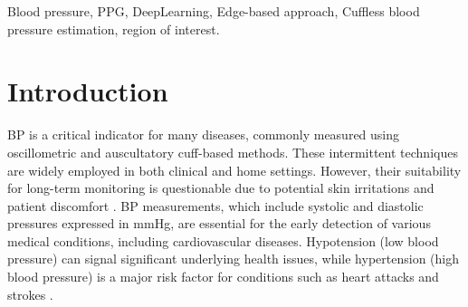\documentclass[journal,twoside,web]{ieeecolor}
\begin{document}
{{\begin{minipage}{\textwidth}
\begin{IEEEkeywords}
Blood pressure, PPG, DeepLearning, Edge-based approach, Cuffless blood pressure estimation, region of interest.
\end{IEEEkeywords}
\end{minipage}}}


\maketitle
\section{Introduction}\label{introduction}
BP is a critical indicator for many diseases, commonly measured using oscillometric and auscultatory cuff-based methods. These intermittent techniques are widely employed in both clinical and home settings. However, their suitability for long-term monitoring is questionable due to potential skin irritations and patient discomfort \cite{b1}. BP measurements, which include systolic and diastolic pressures expressed in mmHg, are essential for the early detection of various medical conditions, including cardiovascular diseases. Hypotension (low blood pressure) can signal significant underlying health issues, while hypertension (high blood pressure) is a major risk factor for conditions such as heart attacks and strokes \cite{b2}. 
                                                                                                                               
\end{document}
